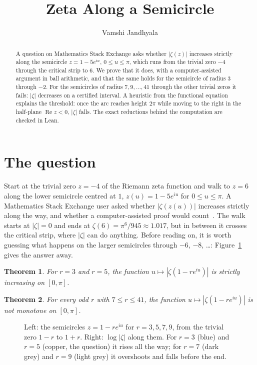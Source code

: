\documentclass[11pt]{amsart}
\title{Zeta Along a Semicircle}
\author{Vamshi Jandhyala}
\newtheorem{theorem}{Theorem}
\theoremstyle{remark}
\begin{document}
\begin{abstract}
A question on Mathematics Stack Exchange asks whether $|\zeta(z)|$ increases strictly along the semicircle $z=1-5e^{iu}$, $0\le u\le\pi$, which runs from the trivial zero $-4$ through the critical strip to $6$. We prove that it does, with a computer-assisted argument in ball arithmetic, and that the same holds for the semicircle of radius $3$ through $-2$. For the semicircles of radius $7,9,\dots,41$ through the other trivial zeros it fails: $|\zeta|$ decreases on a certified interval. A heuristic from the functional equation explains the threshold: once the arc reaches height $2\pi$ while moving to the right in the half-plane $\operatorname{Re}z<0$, $|\zeta|$ falls. The exact reductions behind the computation are checked in Lean.
\end{abstract}

\maketitle

\section{The question}

Start at the trivial zero $z=-4$ of the Riemann zeta function and walk to $z=6$ along the lower semicircle centred at $1$, $z(u)=1-5e^{iu}$ for $0\le u\le\pi$. A Mathematics Stack Exchange user asked whether $|\zeta(z(u))|$ increases strictly along the way, and whether a computer-assisted proof would count~\cite{MSE}. The walk starts at $|\zeta|=0$ and ends at $\zeta(6)=\pi^6/945\approx1.017$, but in between it crosses the critical strip, where $|\zeta|$ can do anything. Before reading on, it is worth guessing what happens on the larger semicircles through $-6$, $-8$, \dots: Figure~\ref{fig:arcs} gives the answer away.

\begin{theorem}\label{thm:main}
For $r=3$ and $r=5$, the function $u\mapsto|\zeta(1-re^{iu})|$ is strictly increasing on $[0,\pi]$.
\end{theorem}

\begin{theorem}\label{thm:fail}
For every odd $r$ with $7\le r\le41$, the function $u\mapsto|\zeta(1-re^{iu})|$ is not monotone on $[0,\pi]$.
\end{theorem}

\begin{figure}[ht]
\centering

\caption{Left: the semicircles $z=1-re^{iu}$ for $r=3,5,7,9$, from the trivial zero $1-r$ to $1+r$. Right: $\log|\zeta|$ along them. For $r=3$ (blue) and $r=5$ (copper, the question) it rises all the way; for $r=7$ (dark grey) and $r=9$ (light grey) it overshoots and falls before the end.}
\label{fig:arcs}
\end{figure}
\end{document}
